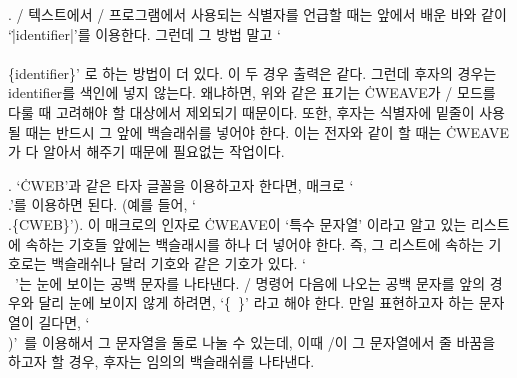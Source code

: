 {%
. \TEX/ 텍스트에서 \CEE/ 프로그램에서 사용되는 식별자를  언급할 때는 앞에서 배운
바와 같이 `\.{|identifier|}'를 이용한다. 그런데 그 방법 말고 `\.{\\\\\{identifier\}}'
로 하는 방법이 더 있다. 이 두 경우 출력은 같다. 그런데 후자의 경우는 \\{identifier}를 
색인에 넣지 않는다. 왜냐하면, 위와 같은 표기는 \.{CWEAVE}가 \CEE/ 모드를 다룰 때 고려해야
할 대상에서 제외되기 때문이다. 또한, 후자는 식별자에 밑줄이 사용될 때는 반드시
그 앞에 백슬래쉬를 넣어야 한다. 이는 전자와 같이 할 때는 \.{CWEAVE}가 다 알아서 해주기
때문에 필요없는 작업이다.

. `\.{CWEB}'과 같은 타자 글꼴을 이용하고자 한다면, 매크로 `\.{\\.}'를 이용하면
된다. (예를 들어, `\.{\\.\{CWEB\}}'). 이 매크로의 인자로 \.{CWEAVE}이 `특수 문자열'
이라고 알고 있는 리스트에 속하는 기호들 앞에는 백슬래시를 하나 더 넣어야 한다. 즉, 그 리스트에
속하는 기호로는 백슬래쉬나 달러 기호와 같은 기호가 있다. `\.{\\\ }'는 눈에 보이는 공백 문자를
나타낸다. \TEX/ 명령어 다음에 나오는 공백 문자를 앞의 경우와 달리 눈에 보이지 않게 하려면,
`\.{\{\ \}}' 라고 해야 한다. 만일 표현하고자 하는 문자열이 길다면, `\.{\\)}'\, 를
이용해서 그 문자열을 둘로 나눌 수 있는데, 이때 \TEX/이 그 문자열에서 줄 바꿈을 하고자 할 경우,
후자는 임의의 백슬래쉬를 나타낸다.

}
